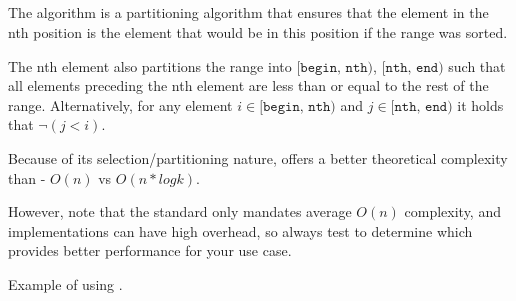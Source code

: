 \subsection{\texorpdfstring{}{\texttt{std::nth\_element}}}

The  algorithm is a partitioning algorithm that ensures that the element in the nth position is the element that would be in this position if the range was sorted.

The nth element also partitions the range into $\texttt{[begin, nth)}$, $\texttt{[nth, end)}$ such that all elements preceding the nth element are less than or equal to the rest of the range. Alternatively, for any element $i \in \texttt{[begin, nth)}$ and $j \in \texttt{[nth, end)}$ it holds that $\neg (j < i)$.



Because of its selection/partitioning nature,  offers a better theoretical complexity than  - $O(n)$ vs $O(n*logk)$.

However, note that the standard only mandates average $O(n)$ complexity, and  implementations can have high overhead, so always test to determine which provides better performance for your use case.

\begin{box-note}
\footnotesize Example of using .
\tcblower
{}
\end{box-note}